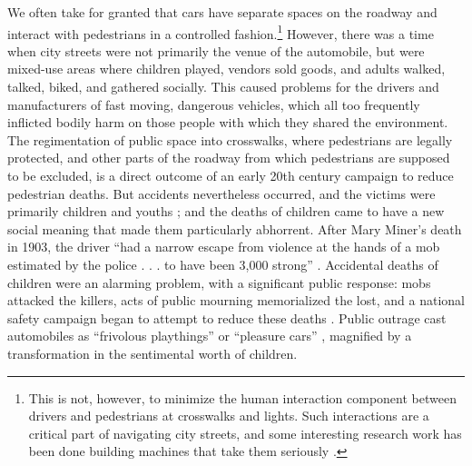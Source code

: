 We often take for granted that cars have separate spaces on
the roadway and interact with pedestrians in a controlled
fashion.\footnote{This is not, however, to minimize the human
  interaction component between drivers and pedestrians at crosswalks
  and lights. Such interactions are a critical part of navigating city
  streets, and some interesting research work has been done building
  machines that take them seriously \cite{aevita}.} However, there was a
time when city streets were not primarily the venue of the automobile,
but were mixed-use areas where children played, vendors sold goods,
and adults walked, talked, biked, and gathered socially. 
This caused problems for the drivers and
manufacturers of fast moving, dangerous vehicles, which all too
frequently inflicted bodily harm on those people with which they
shared the environment. The regimentation of public space into
crosswalks, where pedestrians are legally protected, and other parts
of the roadway from which pedestrians are supposed to be excluded, is
a direct outcome of an early 20th century campaign to reduce
pedestrian deaths. But accidents nevertheless occurred, and the victims were primarily
children and youths \cite[p. 11]{nortonFighting}; and the deaths of
children came to have a new social meaning that made them 
particularly abhorrent.
After Mary Miner's death in 1903, the driver ``had a narrow escape
from violence at the hands of a mob estimated by the police . . . to
have been 3,000 strong'' \cite[p. 22]{zelizer}. Accidental deaths of children were an
alarming problem, with a significant public response:  mobs attacked
the killers, acts of public mourning memorialized the lost, and a
national safety campaign began to attempt to reduce these
deaths \cite[p. 23]{zelizer}. Public outrage cast automobiles as
``frivolous playthings'' or ``pleasure cars'' \cite[p. 12]{nortonFighting}, magnified
by a transformation in the sentimental worth of
children. 


